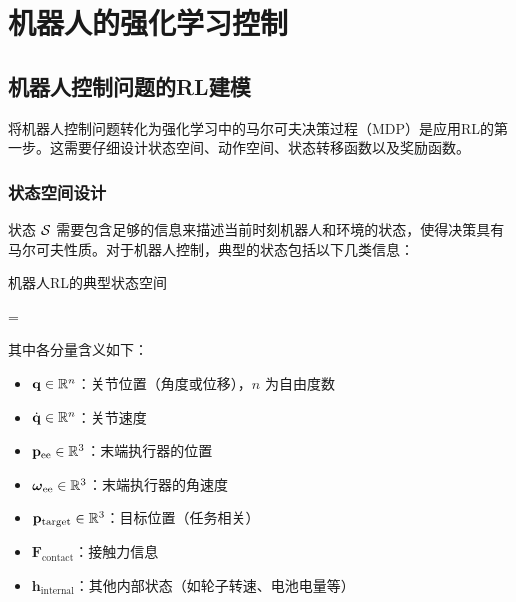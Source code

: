 \chapter{机器人的强化学习控制}


\section{机器人控制问题的RL建模}

将机器人控制问题转化为强化学习中的马尔可夫决策过程（MDP）是应用RL的第一步。这需要仔细设计状态空间、动作空间、状态转移函数以及奖励函数。

\subsection{状态空间设计}

状态 $\mathcal{S}$ 需要包含足够的信息来描述当前时刻机器人和环境的状态，使得决策具有马尔可夫性质。对于机器人控制，典型的状态包括以下几类信息：

\begin{mydefinition}{机器人RL的典型状态空间}
\begin{myformula}
\states = 
\end{myformula}
其中各分量含义如下：
\begin{itemize}
    \item $\mathbf{q} \in \mathbb{R}^n$：关节位置（角度或位移），$n$ 为自由度数
    \item $\dot{\mathbf{q}} \in \mathbb{R}^n$：关节速度
    \item $\mathbf{p}_{\text{ee}} \in \mathbb{R}^3$：末端执行器的位置
    \item $\boldsymbol{\omega}_{\text{ee}} \in \mathbb{R}^3$：末端执行器的角速度
    \item $\mathbf{p}_{\text{target}} \in \mathbb{R}^3$：目标位置（任务相关）
    \item $\mathbf{F}_{\text{contact}}$：接触力信息
    \item $\mathbf{h}_{\text{internal}}$：其他内部状态（如轮子转速、电池电量等）
\end{itemize}
\end{mydefinition}

